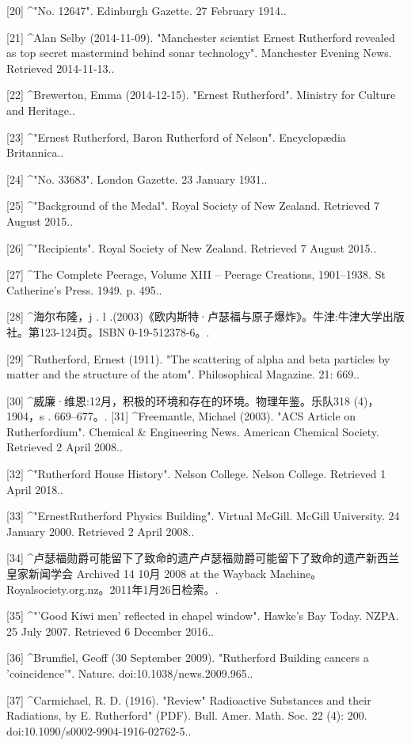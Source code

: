 [20]
^"No. 12647". Edinburgh Gazette. 27 February 1914..

[21]
^Alan Selby (2014-11-09). "Manchester scientist Ernest Rutherford revealed as top secret mastermind behind sonar technology". Manchester Evening News. Retrieved 2014-11-13..

[22]
^Brewerton, Emma (2014-12-15). "Ernest Rutherford". Ministry for Culture and Heritage..

[23]
^"Ernest Rutherford, Baron Rutherford of Nelson". Encyclopædia Britannica..

[24]
^"No. 33683". London Gazette. 23 January 1931..

[25]
^"Background of the Medal". Royal Society of New Zealand. Retrieved 7 August 2015..

[26]
^"Recipients". Royal Society of New Zealand. Retrieved 7 August 2015..

[27]
^The Complete Peerage, Volume XIII – Peerage Creations, 1901–1938. St Catherine's Press. 1949. p. 495..

[28]
^海尔布隆，j . l .(2003)《欧内斯特·卢瑟福与原子爆炸》。牛津:牛津大学出版社。第123-124页。ISBN 0-19-512378-6。.

[29]
^Rutherford, Ernest (1911). "The scattering of alpha and beta particles by matter and the structure of the atom". Philosophical Magazine. 21: 669..

[30]
^威廉·维恩:12月，积极的环境和存在的环境。物理年鉴。乐队318 (4)，1904，s . 669–677。.
[31]
^Freemantle, Michael (2003). "ACS Article on Rutherfordium". Chemical & Engineering News. American Chemical Society. Retrieved 2 April 2008..

[32]
^"Rutherford House History". Nelson College. Nelson College. Retrieved 1 April 2018..

[33]
^"ErnestRutherford Physics Building". Virtual McGill. McGill University. 24 January 2000. Retrieved 2 April 2008..

[34]
^卢瑟福勋爵可能留下了致命的遗产卢瑟福勋爵可能留下了致命的遗产新西兰皇家新闻学会 Archived 14 10月 2008 at the Wayback Machine。Royalsociety.org.nz。2011年1月26日检索。.

[35]
^"'Good Kiwi men' reflected in chapel window". Hawke's Bay Today. NZPA. 25 July 2007. Retrieved 6 December 2016..

[36]
^Brumfiel, Geoff (30 September 2009). "Rutherford Building cancers a 'coincidence'". Nature. doi:10.1038/news.2009.965..

[37]
^Carmichael, R. D. (1916). "Review" Radioactive Substances and their Radiations, by E. Rutherford" (PDF). Bull. Amer. Math. Soc. 22 (4): 200. doi:10.1090/s0002-9904-1916-02762-5..